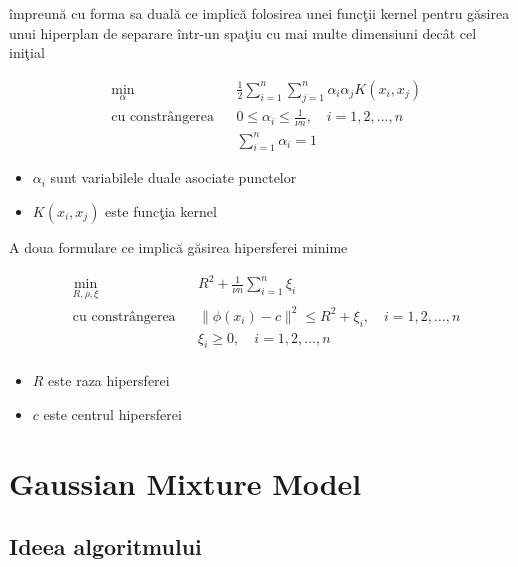     împreună cu forma sa duală ce implică folosirea unei funcţii kernel pentru găsirea unui hiperplan 
    de separare într-un spaţiu cu mai multe dimensiuni decât cel iniţial


    \begin{equation}
        \begin{aligned}
        & \underset{\alpha}{\text{min}}
        & & \frac{1}{2} \sum_{i=1}^{n} \sum_{j=1}^{n} \alpha_i \alpha_j K(x_i, x_j) \\
        & \text{cu constrângerea}
        & & 0 \leq \alpha_i \leq \frac{1}{\nu n}, \quad i=1,2,\ldots,n \\
        &&& \sum_{i=1}^{n} \alpha_i = 1
        \end{aligned}
        \end{equation}
    
    \begin{itemize}
        \item $\alpha_i$ sunt variabilele duale asociate punctelor 
        \item $K(x_i, x_j)$ este funcţia kernel
    \end{itemize}

A doua formulare ce implică găsirea hipersferei minime

    \begin{equation}
        \begin{aligned}
        & \underset{R, \rho, \xi}{\text{min}}
        & & R^2 + \frac{1}{\nu n} \sum_{i=1}^{n} \xi_i \\
        & \text{cu constrângerea}
        & & \|\phi(x_i) - c\|^2 \leq R^2 + \xi_i, \quad i=1,2,\ldots,n \\
        &&& \xi_i \geq 0, \quad i=1,2,\ldots,n \\
        \end{aligned}
        \end{equation}
        
        \begin{itemize}
        \item $R$ este raza hipersferei
        \item $c$ este centrul hipersferei
        \end{itemize}
        

\section{Gaussian Mixture Model}

\subsection{Ideea algoritmului}

